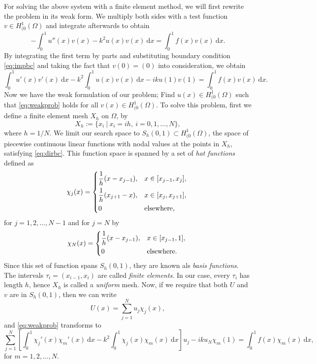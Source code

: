 \documentclass[a4paper]{article}
\newcommand{\dd}{\mathrm{d}}
\newcommand{\HOzero}{\ensuremath{H^1_{(0}(\Omega)}}
\begin{document}
For solving the above system with a finite element method, we will
first rewrite the problem in its weak form.  We multiply both sides
with a test function $v \in \HOzero$ and integrate afterwards to
obtain
\begin{equation}
  - \int^1_0 u''(x)v(x) - k^2u(x)v(x) \ \dd x = \int^1_0 f(x)v(x) \ \dd x.
\end{equation}
By integrating the first term by parts and substituting boundary
condition \eqref{eq:impbc} and taking the fact that $v(0) = (0)$ into
consideration, we obtain
\begin{equation} \label{eq:weakprob}
  \int^1_0 u'(x)v'(x)\ \dd x - k^2 \int^1_0 u(x)v(x) \ \dd x - iku(1)v(1) = \int^1_0 f(x)v(x) \ \dd x.
\end{equation}
Now we have the weak formulation of our problem; Find $u(x) \in
\HOzero$ such that \eqref{eq:weakprob} holds for all $v(x) \in
\HOzero$.  To solve this problem, first we define a finite element
mesh $X_h$ on $\Omega$, by
\begin{equation}
  X_h := \{ x_i \ | \ x_i = ih, \ i = 0, 1, \ldots, N \},
\end{equation}
where $h = 1/N$.
We limit our search space to $S_h(0,1) \subset \HOzero$, the space of
piecewise continuous linear functions with nodal values at the points
in $X_h$, satisfying \eqref{eq:dirbc}. This function space is spanned
by a set of \emph{hat functions} defined as
\begin{equation}
  \chi_j(x) = \begin{dcases*}
    \frac{1}{h} (x - x_{j - 1}), & $x \in [x_{j - 1}, x_j],$ \\
    \frac{1}{h} (x_{j + 1} - x), & $x \in [x_{j}, x_{j + 1}],$ \\
    0 & elsewhere,
  \end{dcases*}
\end{equation}
for $j = 1, 2, \ldots, N - 1$ and for $j = N$ by
\begin{equation}
  \chi_N(x) = \begin{dcases*}
    \frac{1}{h} (x - x_{j - 1}), & $x \in [x_{j - 1}, 1],$ \\
    0 & elsewhere.
  \end{dcases*}
\end{equation}
Since this set of function spans $S_h(0,1)$, they are known als
\emph{basis functions}. The intervals $\tau_i = (x_{i - 1}, x_i)$ are
called \emph{finite elements}. In our case, every $\tau_i$ has length
$h$, hence $X_h$ is called a \emph{uniform} mesh. Now, if we require
that both $U$ and $v$ are in  $S_h(0,1)$, then we can write
\begin{equation} \label{eq:Usum}
  U(x) = \sum^N_{j = 1} u_j \chi_j(x),
\end{equation}
and \eqref{eq:weakprob} transforms to
\begin{equation} \label{eq:linsys}
  \sum^N_{j = 1} \left[ \int^1_0 \chi_j'(x) \chi_m'(x) \ \dd x
    - k^2 \int^1_0 \chi_j(x) \chi_m(x) \ \dd x \right] u_j
    - i k u_N \chi_m(1)
  =
    \int^1_0 f(x) \chi_m(x) \ \dd x,
\end{equation}
for $m = 1, 2, \ldots, N$.
\end{document}
